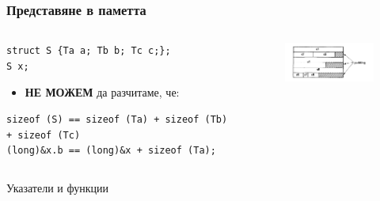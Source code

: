 \documentclass{beamer}
\begin{document}
\begin{frame}[fragile]
\frametitle{Представяне в паметта}


\begin{columns}[t]
  \begin{column}{0.7\textwidth}

  \begin{flushleft}


\begin{lstlisting}
struct S {Ta a; Tb b; Tc c;};
S x;
\end{lstlisting}
   \end {flushleft}

\begin{itemize}
\item \textbf{НЕ МОЖЕМ} да разчитаме, че:
\end{itemize}

\begin{flushleft}
\begin{lstlisting}
sizeof (S) == sizeof (Ta) + sizeof (Tb) + sizeof (Tc)
(long)&x.b == (long)&x + sizeof (Ta);
\end{lstlisting}
\end{flushleft}

  \end{column}
  \begin{column}{0.3\textwidth}
\begin{figure}
\includegraphics[width=4.5cm]{images/padding}
\end{figure}

  \end{column}
\end{columns}


\end{frame}


\begin{frame}
\centerline{Указатели и функции}
\end{frame}
\end{document}
